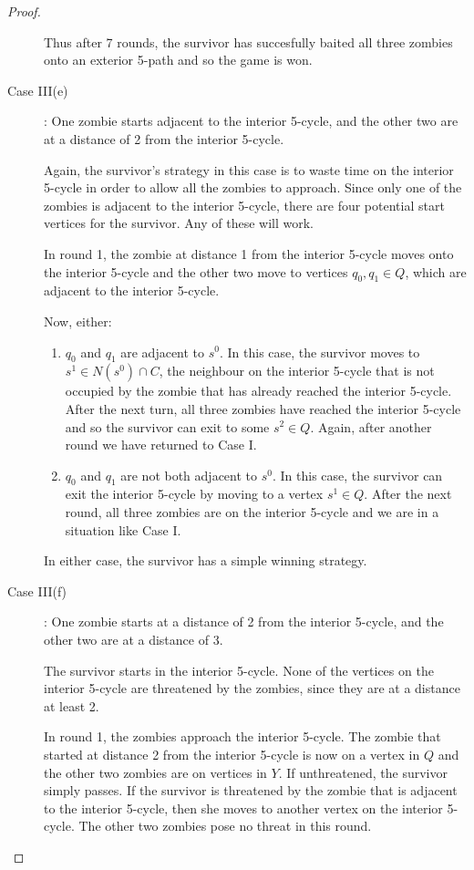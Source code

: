 \begin{proof}
\begin{description}
Thus after 7 rounds, the survivor has succesfully baited all three zombies onto an exterior 5-path and so the game is won.

\item[Case III(e)]: One zombie starts adjacent to the interior 5-cycle, and the other two are at a distance of 2 from the interior 5-cycle.

Again, the survivor's strategy in this case is to waste time on the interior 5-cycle in order to allow all the zombies to approach. Since only one of the
zombies is adjacent to the interior 5-cycle, there are four potential start vertices for the survivor. Any of these will work.

In round 1, the zombie at distance 1 from the interior 5-cycle moves onto the interior 5-cycle and the other two move to vertices $q_0, q_1 \in Q$,
which are adjacent to the interior 5-cycle.

Now, either:

\begin{enumerate}
\item $q_0$ and $q_1$ are adjacent to $s^0$. In this case, the survivor moves to $s^1 \in N(s^0) \cap C$, the neighbour on the interior 5-cycle that is not occupied
by the zombie that has already reached the interior 5-cycle. After the next turn, all three zombies have reached the interior 5-cycle and so the survivor can
exit to some $s^2 \in Q$. Again, after another round we have returned to Case I.

\item $q_0$ and $q_1$ are not both adjacent to $s^0$. In this case, the survivor can exit the interior 5-cycle by moving to a vertex $s^1 \in Q$. After the next
round, all three zombies are on the interior 5-cycle and we are in a situation like Case I.
\end{enumerate}

In either case, the survivor has a simple winning strategy.

\item[Case III(f)]: One zombie starts at a distance of 2 from the interior 5-cycle, and the other two are at a distance of 3.

The survivor starts in the interior 5-cycle. None of the vertices on the interior 5-cycle are threatened by the zombies, since they are at a distance at least 2.

In round 1, the zombies approach the interior 5-cycle. The zombie that started at distance 2 from the interior 5-cycle is now on a vertex in $Q$ and the other two
zombies are on vertices in $Y$. If unthreatened, the survivor simply passes.
If the survivor is threatened by the zombie that is adjacent to the interior 5-cycle, then she moves to another vertex on the interior 5-cycle. The other two zombies
pose no threat in this round.


\end{description}
\end{proof}
